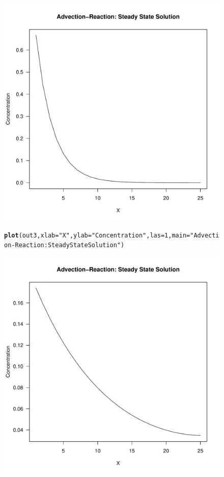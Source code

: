 \documentclass{tufte-handout}\usepackage[]{graphicx}\usepackage[]{xcolor}
\makeatletter
\def\maxwidth{ %
  \ifdim\Gin@nat@width>\linewidth
    \linewidth
  \else
    \Gin@nat@width
  \fi
}
\newcommand{\hlnum}[1]{\textcolor[rgb]{0.686,0.059,0.569}{#1}}%
\newcommand{\hlstr}[1]{\textcolor[rgb]{0.192,0.494,0.8}{#1}}%
\newcommand{\hlstd}[1]{\textcolor[rgb]{0.345,0.345,0.345}{#1}}%
\newcommand{\hlkwc}[1]{\textcolor[rgb]{0.333,0.667,0.333}{#1}}%
\newcommand{\hlkwd}[1]{\textcolor[rgb]{0.737,0.353,0.396}{\textbf{#1}}}%
\newenvironment{kframe}{%
 \def\at@end@of@kframe{}%
 \ifinner\ifhmode%
  \def\at@end@of@kframe{\end{minipage}}%
  \begin{minipage}{\columnwidth}%
 \fi\fi%
 \def\FrameCommand##1{\hskip\@totalleftmargin \hskip-\fboxsep
 \colorbox{shadecolor}{##1}\hskip-\fboxsep
     \hskip-\linewidth \hskip-\@totalleftmargin \hskip\columnwidth}%
 \MakeFramed {\advance\hsize-\width
   \@totalleftmargin\z@ \linewidth\hsize
   \@setminipage}}%
 {\par\unskip\endMakeFramed%
 \at@end@of@kframe}
\newenvironment{knitrout}{}{} %
\makeatother
\begin{document}
\begin{figure}
\begin{knitrout}
\includegraphics[width=\maxwidth]{figure/unnamed-chunk-7-2} 
\begin{kframe}\begin{alltt}
\hlkwd{plot}\hlstd{(out3,} \hlkwc{xlab} \hlstd{=} \hlstr{"X"}\hlstd{,} \hlkwc{ylab} \hlstd{=} \hlstr{"Concentration"}\hlstd{,} \hlkwc{las}\hlstd{=}\hlnum{1}\hlstd{,} \hlkwc{main}\hlstd{=}\hlstr{"Advection-Reaction: Steady State Solution"}\hlstd{)}
\end{alltt}
\end{kframe}
\includegraphics[width=\maxwidth]{figure/unnamed-chunk-7-3} 
\end{knitrout}
\end{figure}
\end{document}

